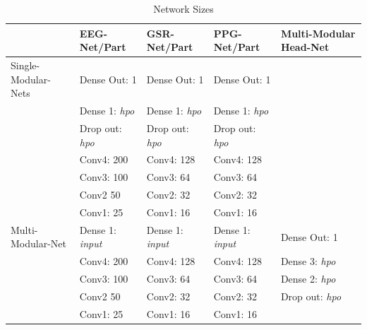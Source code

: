 \documentclass[12pt]{article}
\begin{document}
\bgroup
\def\arraystretch{1.6}%
\begin{table}[h]
\caption{Network Sizes}
\label{table:modelvariations}
\begin{tabular}{lllll}
\hline
        & EEG-Net/Part  & GSR-Net/Part  & PPG-Net/Part  & Multi-Modular Head-Net     \\ \hline
 Single-Modular-Nets & Dense Out: 1 & Dense Out: 1 & Dense Out: 1 &   \\
        & Dense 1: \emph{hpo} & Dense 1: \emph{hpo} & Dense 1: \emph{hpo} &   \\
        \vspace{1.5ex}        
        & Drop out: \emph{hpo} & Drop out: \emph{hpo} & Drop out: \emph{hpo} &   \\
        & Conv4: 200 & Conv4: 128 & Conv4: 128 &    \\ 
        & Conv3: 100 & Conv3: 64 & Conv3: 64 &    \\ 
        & Conv2 50 & Conv2: 32 & Conv2: 32 &    \\ 
        \vspace{3ex}
        & Conv1: 25 & Conv1: 16 & Conv1: 16 &  \\         
  Multi-Modular-Net & Dense 1: \emph{input} & Dense 1: \emph{input} & Dense 1: \emph{input} & Dense Out: 1  \\
        & Conv4: 200 & Conv4: 128 & Conv4: 128  &  Dense 3: \emph{hpo} \\ 
        & Conv3: 100 & Conv3: 64 & Conv3: 64 & Dense 2: \emph{hpo}  \\ 
        & Conv2 50 & Conv2: 32 & Conv2: 32 & Drop out: \emph{hpo}    \\ 
        \vspace{3ex}
        & Conv1: 25 & Conv1: 16 & Conv1: 16 &    \\   \hline
\end{tabular}
\vspace{2ex}
\begin{doublespacing}


\end{doublespacing}
\end{table}
\egroup
\restoregeometry
\end{document}
